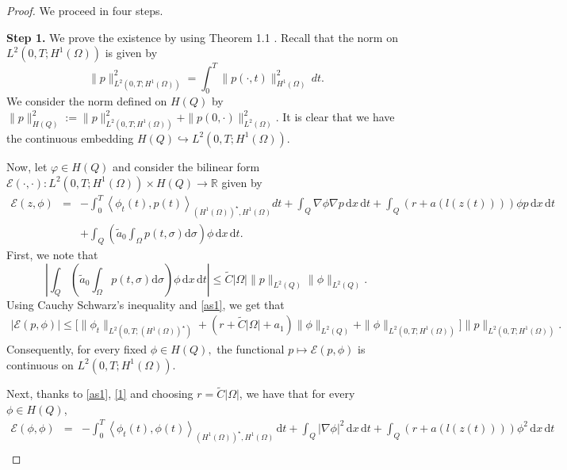 \documentclass[reqno,twoside]{amsart}
\numberwithin{equation}{section}
\theoremstyle{definition}
\numberwithin{equation}{section}
\def \dis {\displaystyle}
\def \R {\mathbb{R}}
\def \V {\cal V}
\def \dt{\mathrm{d}t}
\def \dq {\mathrm{d}x \, \mathrm{d}t}
\def \d {\mathrm{d}}
\def \R {\mathbb{R}}
\def \V {\mathbb{ V}}
\begin{document}
\begin{proof}We proceed in four steps.\par 	
\textbf{Step 1.}  We prove the existence by using Theorem 1.1 \cite[Page 37]{lions2013}.
Recall that the norm on  $L^2(0,T;H^1(\Omega))$ is given by
$$\|p\|^2_{L^2(0,T;H^1(\Omega))}=\int_0^T \|p(\cdot,t)\|^2_{H^1(\Omega)}\, dt.$$
We consider the norm defined on  $H(Q)$ by $\|p\|^2_{H(Q)}:=\|p\|^2_{L^2(0,T;H^1(\Omega))}+\|p(0,\cdot)\|^2_{L^2(\Omega)}.$
It is clear that we have the continuous embedding $H(Q)\hookrightarrow L^2(0,T;H^1(\Omega))$.\par 		
Now, let $\varphi \in H(Q)$ and consider the bilinear form $\mathcal{E}(\cdot,\cdot):L^2(0,T;H^1(\Omega))\times H(Q)\to\R$ given by
\begin{equation}\label{defCalE}
	\begin{array}{lll}
		\dis	\mathcal{E}(z,\phi)&=& \dis -\int_{0}^{T} \left\langle \phi_t(t),p(t)\right\rangle_{(H^{1}(\Omega))^\star,H^1(\Omega)} dt+ \int_Q \nabla \phi\nabla p\, \dq+\int_Q( r+a\left(l(z(t))\right)) \phi p\, \dq\\
		&&+\dis \int_Q\left(\tilde{a}_0 \dis \int_{\Omega}p(t,\sigma)\d\sigma\right)\phi\, \dq.
	\end{array}
\end{equation}
First, we note that
\begin{equation}\label{1}
	\left|\int_Q\left(\tilde{a}_0 \dis \int_{\Omega}p(t,\sigma)\d\sigma\right)\phi\, \dq\right|\leq \tilde{C}|\Omega|\|p\|_{L^2(Q)}\|\phi\|_{L^2(Q)}.
\end{equation}
Using Cauchy Schwarz's inequality and \eqref{as1},  we get that
\begin{align*}
	\dis |\mathcal{E}(p,\phi)|
	\leq  \Big[\|\phi_{t}\|_{L^2(0,T;(H^1(\Omega))^\star)}+\left(r+\tilde{C}|\Omega|+a_1\right)\|\phi\|_{L^2(Q)}+\|\phi\|_{L^2(0,T;H^1(\Omega))}\Big]\|p\|_{L^2(0,T;H^1(\Omega))}.
\end{align*}
Consequently, for every fixed $\phi\in H(Q),$
the functional  $p\mapsto \mathcal{E}(p,\phi)$ is continuous on $L^2(0,T;H^1(\Omega)).$\par 			
Next, thanks to \eqref{as1}, \eqref{1} and choosing $r=\tilde{C}|\Omega|$,  we have that for every  $\phi\in H(Q)$,
$$\begin{array}{rlll}
	\mathcal{E}(\phi,\phi)&=&\dis-\int_{0}^{T} \left\langle \phi_t(t),\phi(t)\right\rangle_{(H^{1}(\Omega))^\star,H^1(\Omega)} \, \dt+ \int_Q |\nabla \phi|^2\, \dq+\int_Q( r+a\left(l(z(t))\right)) \phi^2\, \dq\\

\end{array}$$
\end{proof}
\end{document}
